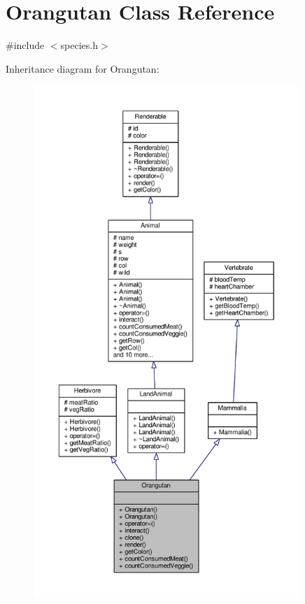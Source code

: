 \hypertarget{classOrangutan}{}\section{Orangutan Class Reference}
\label{classOrangutan}


{\ttfamily \#include $<$species.\+h$>$}



Inheritance diagram for Orangutan\+:
\nopagebreak
\begin{figure}[H]
\begin{center}
\leavevmode
\includegraphics[height=550pt]{classOrangutan__inherit__graph}
\end{center}
\end{figure}


